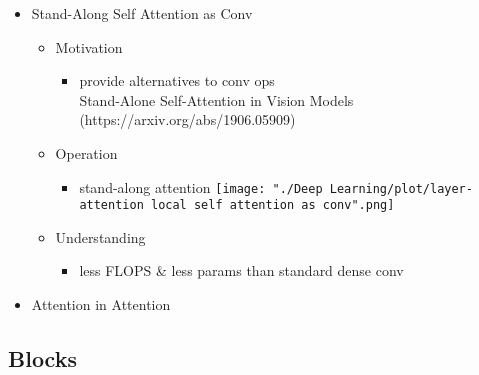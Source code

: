 \begin{itemize}
\item Stand-Along Self Attention as Conv
	\begin{itemize}
	\item Motivation
		\begin{itemize}
		\item provide alternatives to conv ops \\
		Stand-Alone Self-Attention in Vision Models (https://arxiv.org/abs/1906.05909)
		\end{itemize}
	\item Operation
		\begin{itemize}
		\item stand-along attention
		\texttt{[image: "./Deep Learning/plot/layer-attention local self attention as conv".png]}
		\end{itemize}
	\item Understanding
		\begin{itemize}
		\item less FLOPS \& less params than standard dense conv
		\end{itemize}
	\end{itemize}

\item Attention in Attention
\end{itemize}

\subsection{Blocks}
